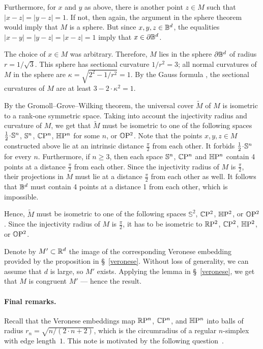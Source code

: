 \documentclass[a4paper,10pt]{article}
\begin{document}
Furthermore, for $x$ and $y$ as above,
there is another point $z\in M$ such that $|x-z|=|y-z|=1$.
If not, then again, the argument in the sphere theorem would imply that $M$ is a sphere.
But since $x,y,z\in\mathbb{B}^d$,
the equalities $|x-y|=|y-z|=|x-z|=1$ imply that $x\in \partial \mathbb{B}^d$.

The choice of $x\in M$ was arbitrary.
Therefore, $M$ lies in the sphere $\partial \mathbb{B}^d$ of radius $r=1/\sqrt{3}$.
This sphere has sectional curvature $1/r^2=3$;
all normal curvatures of $M$ in the sphere are $\kappa=\sqrt{2^2-1/r^2}=1$.
By the Gauss formula \cite[Lemma 5]{petrunin2024}, the sectional curvatures of $M$ are at least $3-2\cdot \kappa^2=1$.

By the Gromoll--Grove--Wilking theorem, the universal cover $\tilde M$ of $M$ is isometric to a rank-one symmetric space.
Taking into account the injectivity radius and curvature of $M$, we get that $\tilde M$ must be isometric to one of the following spaces
$\tfrac12\cdot \SSS^n$, $\mathbb{S}^n$, $\mathbb{C}\mathrm{P}^n$, $\mathbb{H}\mathrm{P}^n$ for some $n$, or $\mathbb{O}\mathrm{P}^2$.
Note that the points $x,y,z\in M$ constructed above lie at an intrinsic distance $\tfrac\pi2$ from each other.
It forbids $\tfrac12\cdot \SSS^n$ for every $n$.
Furthermore, if $n\ge 3$, then each space  $\mathbb{S}^n$, $\mathbb{C}\mathrm{P}^n$ and $\mathbb{H}\mathrm{P}^n$ contain 4 points at a distance $\tfrac\pi2$ from each other.
Since the injectivity radius of $M$ is $\tfrac\pi2$, their projections in $M$ must lie at a distance $\tfrac\pi2$ from each other as well.
It follows that $\mathbb{B}^d$ must contain 4 points at a distance 1 from each other, which is impossible.

Hence, $\tilde M$ must be isometric to one of the following spaces $\mathbb{S}^2$, $\mathbb{C}\mathrm{P}^2$, $\mathbb{H}\mathrm{P}^2$, or $\mathbb{O}\mathrm{P}^2$.
Since the injectivity radius of $M$ is $\tfrac\pi2$, 
it has to be isometric to $\mathbb{R}\mathrm{P}^2$, $\mathbb{C}\mathrm{P}^2$, $\mathbb{H}\mathrm{P}^2$, or $\mathbb{O}\mathrm{P}^2$.

Denote by $M'\subset \mathbb{R}^d$ the image of the corresponding Veronese embedding provided by the proposition in §~\ref{veronese}.
Without loss of generality, we can assume that $d$ is large, so $M'$ exists.
Applying the lemma in §~\ref{veronese}, we get that $M$ is congruent $M'$ --- hence the result. 
\qeds

\paragraph{Final remarks.}
Recall that the Veronese embeddings map $\mathbb{R}\mathrm{P}^n$, $\mathbb{C}\mathrm{P}^n$, and $\mathbb{H}\mathrm{P}^n$ into balls of radius $r_n= \sqrt{n/(2\cdot n+2)}$, which is the circumradius of a regular $n$-simplex with edge length~$1$.
This note is motivated by the following question~\cite{petrunin2023}.
\end{document}
